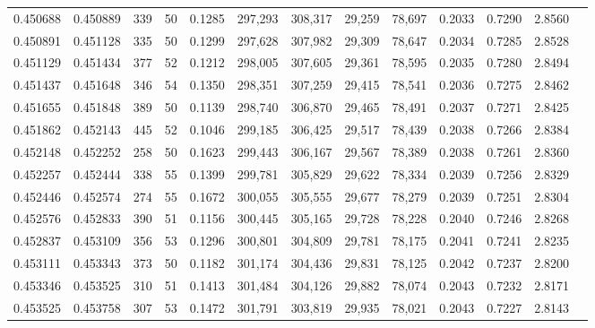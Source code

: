 \begin{tabular}{rrrrrrrrrrrrr}
0.450688 & 0.450889 &   339 &  50 &                                     0.1285 & 297,293 & 308,317 &  29,259 &  78,697 & 0.2033 & 0.7290 & 2.8560 \\
0.450891 & 0.451128 &   335 &  50 &                                     0.1299 & 297,628 & 307,982 &  29,309 &  78,647 & 0.2034 & 0.7285 & 2.8528 \\
0.451129 & 0.451434 &   377 &  52 &                                     0.1212 & 298,005 & 307,605 &  29,361 &  78,595 & 0.2035 & 0.7280 & 2.8494 \\
0.451437 & 0.451648 &   346 &  54 &                                     0.1350 & 298,351 & 307,259 &  29,415 &  78,541 & 0.2036 & 0.7275 & 2.8462 \\
0.451655 & 0.451848 &   389 &  50 &                                     0.1139 & 298,740 & 306,870 &  29,465 &  78,491 & 0.2037 & 0.7271 & 2.8425 \\
0.451862 & 0.452143 &   445 &  52 &                                     0.1046 & 299,185 & 306,425 &  29,517 &  78,439 & 0.2038 & 0.7266 & 2.8384 \\
0.452148 & 0.452252 &   258 &  50 &                                     0.1623 & 299,443 & 306,167 &  29,567 &  78,389 & 0.2038 & 0.7261 & 2.8360 \\
0.452257 & 0.452444 &   338 &  55 &                                     0.1399 & 299,781 & 305,829 &  29,622 &  78,334 & 0.2039 & 0.7256 & 2.8329 \\
0.452446 & 0.452574 &   274 &  55 &                                     0.1672 & 300,055 & 305,555 &  29,677 &  78,279 & 0.2039 & 0.7251 & 2.8304 \\
0.452576 & 0.452833 &   390 &  51 &                                     0.1156 & 300,445 & 305,165 &  29,728 &  78,228 & 0.2040 & 0.7246 & 2.8268 \\
0.452837 & 0.453109 &   356 &  53 &                                     0.1296 & 300,801 & 304,809 &  29,781 &  78,175 & 0.2041 & 0.7241 & 2.8235 \\
0.453111 & 0.453343 &   373 &  50 &                                     0.1182 & 301,174 & 304,436 &  29,831 &  78,125 & 0.2042 & 0.7237 & 2.8200 \\
0.453346 & 0.453525 &   310 &  51 &                                     0.1413 & 301,484 & 304,126 &  29,882 &  78,074 & 0.2043 & 0.7232 & 2.8171 \\
0.453525 & 0.453758 &   307 &  53 &                                     0.1472 & 301,791 & 303,819 &  29,935 &  78,021 & 0.2043 & 0.7227 & 2.8143 \\

\end{tabular}

